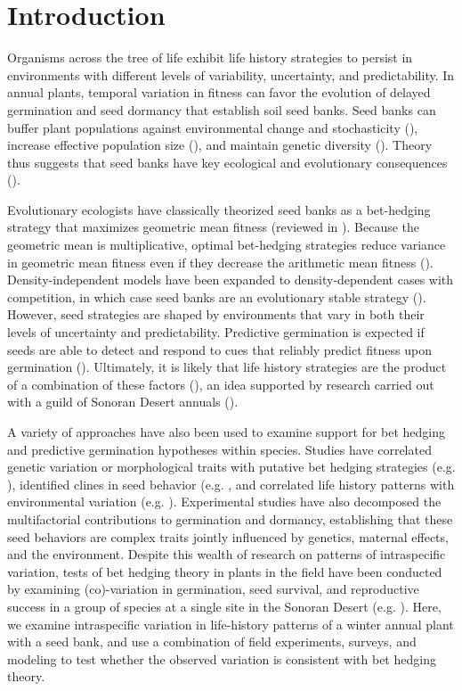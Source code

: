 \documentclass[12pt, oneside]{article}   	%
\title{}
\begin{document}
\section{Introduction}

Organisms across the tree of life exhibit life history strategies to persist in environments with different levels of variability, uncertainty, and predictability. In annual plants, temporal variation in fitness can favor the evolution of delayed germination and seed dormancy that establish soil seed banks. Seed banks can buffer plant populations against environmental change and stochasticity (\cite{eager2014,paniw2017}), increase effective population size (\cite{nunney2002,waples2006}), and maintain genetic diversity (\cite{mccue1998b}). Theory thus suggests that seed banks have key ecological and evolutionary consequences (\cite{evans2005}). 

Evolutionary ecologists have classically theorized seed banks as a bet-hedging strategy that maximizes geometric mean fitness (reviewed in \cite{philippi1989,simons2011}). Because the geometric mean is multiplicative, optimal bet-hedging strategies reduce variance in geometric mean fitness even if they decrease the arithmetic mean fitness (\cite{cohen1966}). Density-independent models have been expanded to density-dependent cases with competition, in which case seed banks are an evolutionary stable strategy (\cite{ellner1985,ellner1985a}). However, seed strategies are shaped by environments that vary in both their levels of uncertainty and predictability. Predictive germination is expected if seeds are able to detect and respond to cues that reliably predict fitness upon germination (\cite{cohen1967}). Ultimately, it is likely that life history strategies are the product of a combination of these factors (\cite{simons2011}), an idea supported by research carried out with a guild of Sonoran Desert annuals (\cite{venable2007,gremer2014,gremer2016}).

A variety of approaches have also been used to examine support for bet hedging and predictive germination hypotheses within species. Studies have correlated genetic variation or morphological traits with putative bet hedging strategies (e.g. \cite{hacker1984,hacker1989,philippi1993a,clauss2000}), identified clines in seed behavior (e.g. \cite{fernandez-pascual2013,gremer2020}, and correlated life history patterns with environmental variation (e.g. \cite{philippi1993}). Experimental studies have also decomposed the multifactorial contributions to germination and dormancy, establishing that these seed behaviors are complex traits jointly influenced by genetics, maternal effects, and the environment. Despite this wealth of research on patterns of intraspecific variation, tests of bet hedging theory in plants in the field have been conducted by examining (co)-variation in germination, seed survival, and reproductive success in a group of species at a single site in the Sonoran Desert (e.g. \cite{venable2007,gremer2014,gremer2016}). Here, we examine intraspecific variation in life-history patterns of a winter annual plant with a seed bank, and use a combination of field experiments, surveys, and modeling to test whether the observed variation is consistent with bet hedging theory. 
\end{document}
